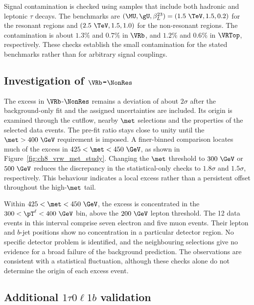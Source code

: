 Signal contamination is checked using samples that include both hadronic and leptonic $\tau$ decays.
The benchmarks are $(\MU,\gU,\beta_L^{23})=(1.5~\TeV,1.5,0.2)$ for the resonant regions and $(2.5~\TeV,1.5,1.0)$ for the non-resonant regions.
The contamination is about $1.3\%$ and $0.7\%$ in $\VRb$, and $1.2\%$ and $0.6\%$ in $\VRTop$, respectively.
These checks establish the small contamination for the stated benchmarks rather than for arbitrary signal couplings.


\clearpage
\subsection[Investigation of VRW-NonRes]{Investigation of $\VRb$-$\NonRes$}
\label{subsec:ch8_vrw_excess}

The excess in $\VRb$-$\NonRes$ remains a deviation of about $2\sigma$ after the background-only fit and the assigned uncertainties are included.
Its origin is examined through the cutflow, nearby $\met$ selections and the properties of the selected data events.
The pre-fit ratio stays close to unity until the $\met>400~\GeV$ requirement is imposed.
A finer-binned comparison locates much of the excess in $425<\met<450~\GeV$, as shown in Figure~\ref{fig:ch8_vrw_met_study}.
Changing the $\met$ threshold to $300~\GeV$ or $500~\GeV$ reduces the discrepancy in the statistical-only checks to $1.8\sigma$ and $1.5\sigma$, respectively.
This behaviour indicates a local excess rather than a persistent offset throughout the high-$\met$ tail.

Within $425<\met<450~\GeV$, the excess is concentrated in the $300<\pT^\ell<400~\GeV$ bin, above the $200~\GeV$ lepton threshold.
The 12 data events in this interval comprise seven electron and five muon events.
Their lepton and $b$-jet positions show no concentration in a particular detector region.
No specific detector problem is identified, and the neighbouring selections give no evidence for a broad failure of the background prediction.
The observations are consistent with a statistical fluctuation, although these checks alone do not determine the origin of each excess event.


\clearpage
\subsection[Additional 1tau0l1b validation]{Additional $1\tau0\ell1b$ validation}
\label{subsec:ch8_tau1b_vr}

